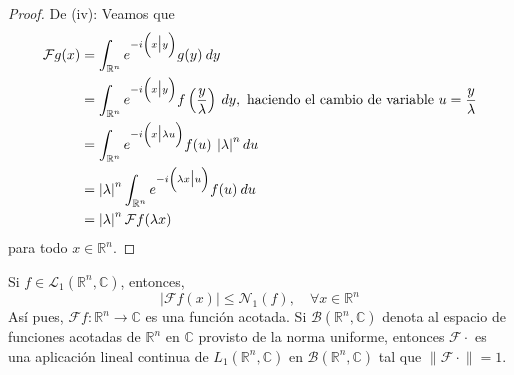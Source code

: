 \documentclass[12pt]{report}
\theoremstyle{largebreak}
\renewcommand{\leq}{\ensuremath{\leqslant}}
\newcommand\abs[1]{\ensuremath{\left|#1\right|}}
\newcommand\cf[3]{\ensuremath{#1:#2\rightarrow#3}}
\newcommand\norm[1]{\ensuremath{\|#1\|}}
\newcommand\pint[2]{\ensuremath{\left(#1\big| #2\right)}}
\newcommand{\N}[2]{\ensuremath{\mathcal{N}_{#1}\left(#2\right)}}
\newcommand{\fou}[1]{\ensuremath{\mathcal{F}#1}}
\begin{document}
\begin{proof}
        De (iv): Veamos que
        \begin{equation*}
            \begin{split}
                \fou{g}(x)&=\int_{\mathbb{R}^n}e^{-i\pint{x}{y}}g(y)\:dy\\
                &=\int_{\mathbb{R}^n}e^{-i\pint{x}{y}}f\left(\frac{y}{\lambda}\right) \:dy,\textup{ haciendo el cambio de variable }u=\frac{y}{\lambda} \\
                &=\int_{\mathbb{R}^n}e^{-i\pint{x}{\lambda u}}f(u) \:\abs{\lambda}^n du\\
                &=\abs{\lambda}^n\int_{\mathbb{R}^n}e^{-i\pint{\lambda x}{ u}}f(u) \:du\\
                &=\abs{\lambda}^n\fou{f}(\lambda x)\\
            \end{split}
        \end{equation*}
        para todo $x\in\mathbb{R}^n$.
    \end{proof}

    \begin{theor}
        Si $f\in\mathcal{L}_1(\mathbb{R}^n,\mathbb{C})$, entonces,
        \begin{equation*}
            \abs{\fou{f}(x)}\leq\N{1}{f},\quad\forall x\in\mathbb{R}^n
        \end{equation*}
        Así pues, $\cf{\fou{f}}{\mathbb{R}^n}{\mathbb{C}}$ es una función acotada. Si $\mathcal{B}(\mathbb{R}^n,\mathbb{C})$ denota al espacio de funciones acotadas de $\mathbb{R}^n$ en $\mathbb{C}$ provisto de la norma uniforme, entonces $\fou{\cdot}$ es una aplicación lineal continua de $L_1(\mathbb{R}^n,\mathbb{C})$ en $\mathcal{B}(\mathbb{R}^n,\mathbb{C})$ tal que $\norm{\fou{\cdot}}=1$.
    \end{theor}
\end{document}
